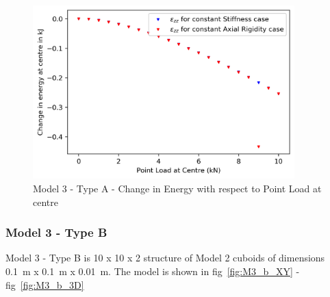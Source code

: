 \begin{figure}[!htbp]
    \centering
    \includegraphics[width = 0.9\textwidth]{Figures/M3_a_energy.png}
    \caption{Model 3 - Type A - Change in Energy with respect to Point Load at centre}
    \label{fig:M3_a_energy}
\end{figure}

\subsubsection{Model 3 - Type B}
Model 3 - Type B is 10 x 10 x 2 structure of Model 2 cuboids of dimensions 0.1~m x 0.1~m x 0.01~m. The model is shown in fig~\ref{fig:M3_b_XY} - fig~\ref{fig:M3_b_3D}

